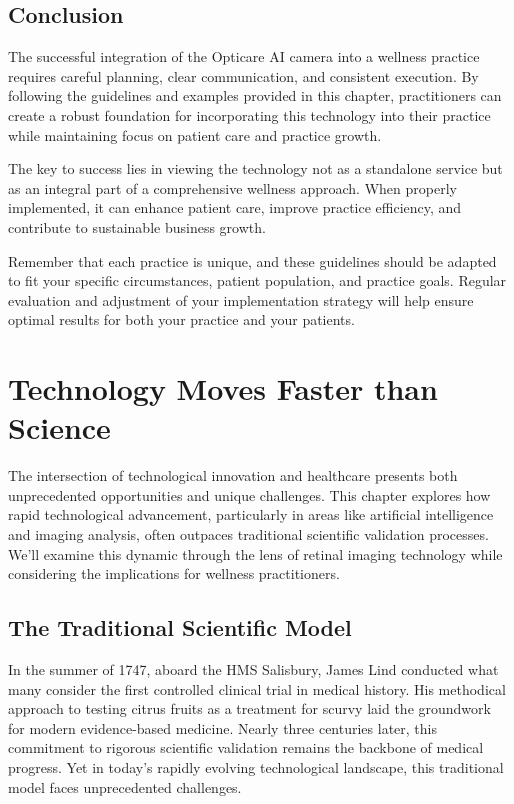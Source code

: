 \documentclass[
  Letterpaper,
]{scrbook}
\begin{document}
\section{Conclusion}\label{conclusion-1}

The successful integration of the Opticare AI camera into a wellness
practice requires careful planning, clear communication, and consistent
execution. By following the guidelines and examples provided in this
chapter, practitioners can create a robust foundation for incorporating
this technology into their practice while maintaining focus on patient
care and practice growth.

The key to success lies in viewing the technology not as a standalone
service but as an integral part of a comprehensive wellness approach.
When properly implemented, it can enhance patient care, improve practice
efficiency, and contribute to sustainable business growth.

Remember that each practice is unique, and these guidelines should be
adapted to fit your specific circumstances, patient population, and
practice goals. Regular evaluation and adjustment of your implementation
strategy will help ensure optimal results for both your practice and
your patients.


\chapter{Technology Moves Faster than
Science}\label{technology-moves-faster-than-science}

The intersection of technological innovation and healthcare presents
both unprecedented opportunities and unique challenges. This chapter
explores how rapid technological advancement, particularly in areas like
artificial intelligence and imaging analysis, often outpaces traditional
scientific validation processes. We'll examine this dynamic through the
lens of retinal imaging technology while considering the implications
for wellness practitioners.

\section{The Traditional Scientific
Model}\label{the-traditional-scientific-model}

In the summer of 1747, aboard the HMS Salisbury, James Lind conducted
what many consider the first controlled clinical trial in medical
history. His methodical approach to testing citrus fruits as a treatment
for scurvy laid the groundwork for modern evidence-based medicine.
Nearly three centuries later, this commitment to rigorous scientific
validation remains the backbone of medical progress. Yet in today's
rapidly evolving technological landscape, this traditional model faces
unprecedented challenges.
\end{document}
